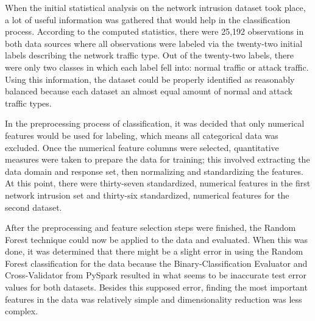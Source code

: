 \documentclass[a4paper,12pt]{IEEEtran}
\begin{document}
When the initial statistical analysis on the network intrusion dataset took place, a lot of useful information was gathered that would help in the classification process. According to the computed statistics, there were 25,192 observations in both data sources where all observations were labeled via the twenty-two initial labels describing the network traffic type. Out of the twenty-two labels, there were only two classes in which each label fell into: normal traffic or attack traffic. Using this information, the dataset could be properly identified as reasonably balanced because each dataset an almost equal amount of normal and attack traffic types.

In the preprocessing process of classification, it was decided that only numerical features would be used for labeling, which means all categorical data was excluded. Once the numerical feature columns were selected, quantitative measures were taken to prepare the data for training; this involved extracting the data domain and response set, then normalizing and standardizing the features. At this point, there were thirty-seven standardized, numerical features in the first network intrusion set and thirty-six standardized, numerical features for the second dataset.

After the preprocessing and feature selection steps were finished, the Random Forest technique could now be applied to the data and evaluated. When this was done, it was determined that there might be a slight error in using the Random Forest classification for the data because the Binary-Classification Evaluator and Cross-Validator from PySpark resulted in what seems to be inaccurate test error values for both datasets. Besides this supposed error, finding the most important features in the data was relatively simple and dimensionality reduction was less complex.
\end{document}
